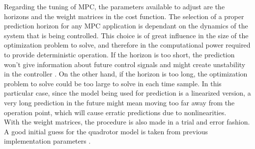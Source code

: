 Regarding the tuning of MPC, the parameters available to adjust are the horizons and the weight matrices in the cost function. The selection of a proper prediction horizon for any MPC application is dependant on the dynamics of the system that is being controlled.  This choice is of great influence in the size of the optimization problem to solve, and therefore in the computational power required to provide deterministic operation. If the horizon is too short, the prediction won't give information about future control signals and might create unstability in the controller \cite{ref:Gabrielsson2012}. On the other hand, if the horizon is too long, the optimization problem to solve could be too large to solve in each time sample. In this particular case, since the model being used for prediction is a linearized version, a very long prediction in the future might mean moving too far away from the operation point, which will cause erratic predictions due to nonlinearities. \\

With the weight matrices, the procedure is also made in a trial and error fashion. A good initial guess for the quadrotor model is taken from previous implementation parameters \cite{ref:Bouffard2012}.

